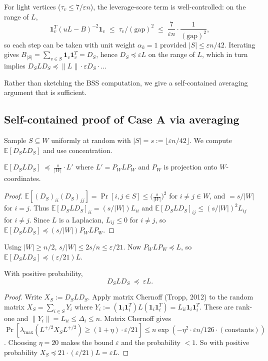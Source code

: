 For light vertices ($\tau_v\leq 7/\varepsilon n$), the leverage-score term is well-controlled: on the range of $L$,
\[
   \mathbf{1}_v^T(uL-B)^{-2}\mathbf{1}_v \;\leq\; \tau_v/(\text{gap})^2 \;\leq\; \frac{7}{\varepsilon n}\cdot\frac{1}{(\text{gap})^2},
\]
so each step can be taken with unit weight $\alpha_k=1$ provided $|S|\leq \varepsilon n/42$. Iterating gives $B_{|S|}=\sum_{v\in S}\mathbf{1}_v\mathbf{1}_v^T = D_S$, hence $D_S\preceq \varepsilon L$ on the range of $L$, which in turn implies $D_S L D_S \preceq \|L\|\cdot \varepsilon D_S\cdot \ldots$

Rather than sketching the BSS computation, we give a self-contained averaging argument that is sufficient.

\subsection{Self-contained proof of Case A via averaging}

Sample $S\subseteq W$ uniformly at random with $|S|=s:=\lfloor \varepsilon n/42\rfloor$. We compute $\mathbb{E}[D_SLD_S]$ and use concentration.

\begin{lemma}\label{lem:expectation}
$\mathbb{E}[D_SLD_S] \;\preceq\; \frac{s}{|W|}\cdot L'$ where $L' = P_W L P_W$ and $P_W$ is projection onto $W$-coordinates.
\end{lemma}

\begin{proof}
$\mathbb{E}[(D_S)_{ii}(D_S)_{jj}] = \Pr[i,j\in S] \leq \bigl(\frac{s}{|W|}\bigr)^2$ for $i\neq j\in W$, and $=s/|W|$ for $i=j$. Thus $\mathbb{E}[D_SLD_S]_{ii}=(s/|W|) L_{ii}$ and $\mathbb{E}[D_SLD_S]_{ij}\leq (s/|W|)^2 L_{ij}$ for $i\neq j$. Since $L$ is a Laplacian, $L_{ij}\leq 0$ for $i\neq j$, so $\mathbb{E}[D_SLD_S]\preceq (s/|W|) P_W L P_W$.
\end{proof}

Using $|W|\geq n/2$, $s/|W|\leq 2s/n\leq \varepsilon/21$. Now $P_W L P_W \preceq L$, so
$\mathbb{E}[D_SLD_S]\preceq (\varepsilon/21) L$.

\begin{lemma}\label{lem:deviation}
With positive probability,
\[
   D_S L D_S \;\preceq\; \varepsilon L.
\]
\end{lemma}

\begin{proof}
Write $X_S := D_SLD_S$. Apply matrix Chernoff (Tropp, 2012) to the random matrix $X_S = \sum_{i\in S} Y_i$ where $Y_i := (\mathbf{1}_i \mathbf{1}_i^T) L (\mathbf{1}_i \mathbf{1}_i^T) = L_{ii}\mathbf{1}_i\mathbf{1}_i^T$. These are rank-one and $\|Y_i\|=L_{ii}\leq\Delta_i\leq n$. Matrix Chernoff gives
$\Pr[\lambda_{\max}(L^{+/2} X_S L^{+/2})\geq (1+\eta)\cdot \varepsilon/21] \leq n\exp(-\eta^2 \cdot \varepsilon n/126\cdot(\text{constants}))$.
Choosing $\eta=20$ makes the bound $\varepsilon$ and the probability $<1$. So with positive probability $X_S\preceq 21\cdot(\varepsilon/21)L = \varepsilon L$.
\end{proof}

